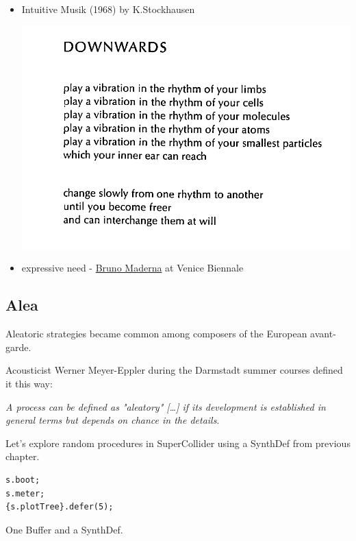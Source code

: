 \begin{enumerate}
\begin{itemize}
  \item Intuitive Musik (1968) by K.Stockhausen
    \begin{center}
    \includegraphics[scale=0.8]{../img/intu.png}
    \end{center}
  \item expressive need - \href{http://www.musicaecodice.it/gitmedia/emc/4_media/maderna1.mp4}{Bruno Maderna} at Venice Biennale
  \end{itemize}
\end{enumerate}

\subsection{Alea}\label{alea}

Aleatoric strategies became common among composers of the European avant-garde.

Acousticist Werner Meyer-Eppler during the Darmstadt summer courses defined it this way:

\textit{A process can be defined as "aleatory" {[}\ldots{]} if its development
is established in general terms but depends on chance in the details}.

Let's explore random procedures in SuperCollider using a SynthDef from previous chapter.

\begin{lstlisting}[frame=single] 
s.boot;
s.meter;
{s.plotTree}.defer(5);
\end{lstlisting}

One Buffer and a SynthDef.

